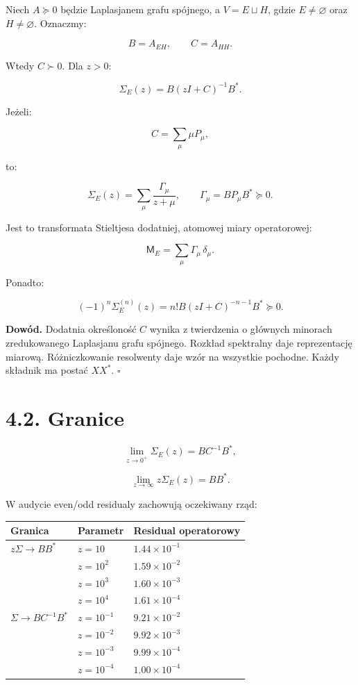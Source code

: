 \documentclass[11pt,a4paper,openany]{report}
\begin{document}
Niech \(A\succeq0\) będzie Laplasjanem grafu spójnego, a \(V=E\sqcup H\), gdzie \(E\neq\varnothing\) oraz \(H\neq\varnothing\). Oznaczmy:

\[
B=A_{EH},\qquad C=A_{HH}.
\]

Wtedy \(C\succ0\). Dla \(z>0\):

\[
\Sigma_E(z)=B(zI+C)^{-1}B^\ast.
\]

Je\.zeli:

\[
C=\sum_{\mu}\mu P_\mu,
\]

to:

\[
\Sigma_E(z)
=
\sum_\mu\frac{\Gamma_\mu}{z+\mu},
\qquad
\Gamma_\mu=BP_\mu B^\ast\succeq0.
\]

Jest to transformata Stieltjesa dodatniej, atomowej miary operatorowej:

\[
\mathsf M_E=\sum_\mu\Gamma_\mu\,\delta_\mu.
\]

Ponadto:

\[
(-1)^n\Sigma_E^{(n)}(z)
=
n!B(zI+C)^{-n-1}B^\ast\succeq0.
\]

\textbf{Dowód.} Dodatnia określoność \(C\) wynika z twierdzenia o głównych minorach zredukowanego Laplasjanu grafu spójnego. Rozkład spektralny daje reprezentację miarową. Ró\.zniczkowanie resolwenty daje wzór na wszystkie pochodne. Ka\.zdy składnik ma postać \(XX^\ast\). \(\square\)

\section{4.2. Granice}

\[
\lim_{z\to0^+}\Sigma_E(z)=BC^{-1}B^\ast,
\]

\[
\lim_{z\to\infty}z\Sigma_E(z)=BB^\ast.
\]

W audycie even/\allowbreak{}odd residualy zachowują oczekiwany rząd:

\begin{center}
\begingroup\small
\setlength{\tabcolsep}{2.5pt}
\renewcommand{\arraystretch}{1.16}
\begin{longtable}{@{}p{}p{}p{}@{}}
\toprule
\textbf{Granica} & \textbf{Parametr} & \textbf{Residual operatorowy} \\
\midrule
\endhead
\(z\Sigma\to BB^\ast\) & \(z=10\) & \(1.44\times10^{-1}\) \\
 & \(z=10^2\) & \(1.59\times10^{-2}\) \\
 & \(z=10^3\) & \(1.60\times10^{-3}\) \\
 & \(z=10^4\) & \(1.61\times10^{-4}\) \\
\(\Sigma\to BC^{-1}B^\ast\) & \(z=10^{-1}\) & \(9.21\times10^{-2}\) \\
 & \(z=10^{-2}\) & \(9.92\times10^{-3}\) \\
 & \(z=10^{-3}\) & \(9.99\times10^{-4}\) \\
 & \(z=10^{-4}\) & \(1.00\times10^{-4}\) \\
\bottomrule
\end{longtable}
\endgroup
\end{center}
\end{document}
